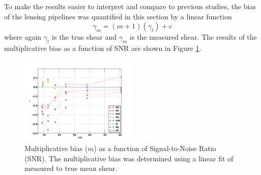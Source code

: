 To make the results easier to interpret and compare to previous
studies, the bias of the lensing pipelines was quantified in this
section by a linear function
\begin{equation}
\gamma_m = (m+1) (\gamma_t) + c
\end {equation}
where again $\gamma_t$ is the true shear and $\gamma_m$ is the measured shear.
The results of the multiplicative bias as a function of SNR are shown in Figure \ref{fig:Snr}. 
\begin{figure}
 \centering  %
  \includegraphics[width=0.5\textwidth]{fig/MvalSNR_v2.pdf} 
  \caption{Multiplicative bias ($m$) as a function
    of Signal-to-Noise Ratio (SNR). The multiplicative bias was determined
    using a linear fit of measured to true mean shear.}
\label{fig:Snr}
\end{figure}

